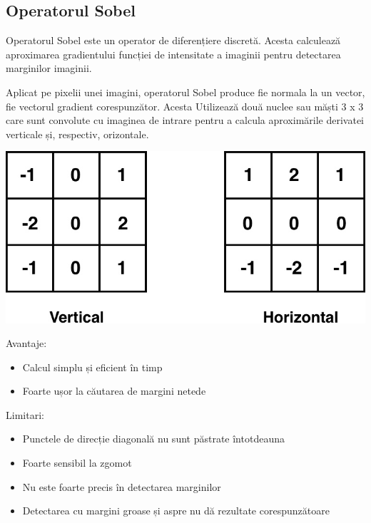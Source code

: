 \documentclass[10pt]{article}
\begin{document}
\newpage

\subsection{Operatorul Sobel}

\> Operatorul Sobel este un operator de diferențiere discretă.
Acesta calculează aproximarea gradientului funcției de intensitate a imaginii pentru detectarea marginilor imaginii.

\> Aplicat pe pixelii unei imagini, operatorul Sobel produce fie normala la un vector, fie vectorul gradient corespunzător.
Acesta Utilizează două nuclee sau măști 3 x 3 care sunt convolute cu imaginea de intrare pentru a calcula aproximările derivatei
verticale și, respectiv, orizontale. 

\begin{center}

  \includegraphics[scale=0.3]{sobel-mask.jpg}
  
\end{center}

\> Avantaje:
\begin{itemize}

  \item Calcul simplu și eficient în timp
  \item Foarte ușor la căutarea de margini netede

\end{itemize}

\> Limitari:
\begin{itemize}

  \item Punctele de direcție diagonală nu sunt păstrate întotdeauna
  \item Foarte sensibil la zgomot
  \item Nu este foarte precis în detectarea marginilor
  \item Detectarea cu margini groase și aspre nu dă rezultate corespunzătoare
  
\end{itemize}
\end{document}
